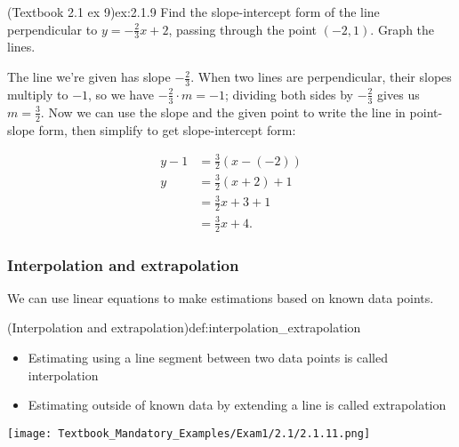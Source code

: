 \documentclass{article}
\begin{document}
\begin{example}{(Textbook 2.1 ex 9)}{ex:2.1.9}
    Find the slope-intercept form of the line perpendicular to $y=-\frac{2}{3}x+2$, passing through the point $(-2,1)$. Graph the lines.
\end{example}
\begin{solution}
    The line we're given has slope $-\frac{2}{3}$. When two lines are perpendicular, their slopes multiply to $-1$, so we have $-\frac{2}{3}\cdot m=-1$; dividing both sides by $-\frac{2}{3}$ gives us $m=\frac{3}{2}$. Now we can use the slope and the given point to write the line in point-slope form, then simplify to get slope-intercept form:
    \begin{minipage}{.49\textwidth}
        \begin{align*}
            y-1&=\frac{3}{2}(x-(-2))\\
            y&=\frac{3}{2}(x+2)+1\\
            &=\frac{3}{2}x+3+1\\
            &=\frac{3}{2}x+4.
        \end{align*}
    \end{minipage}
    \begin{minipage}{.49\textwidth}
        \begin{center}\end{center}
    \end{minipage}
\end{solution}

\subsubsection{Interpolation and extrapolation}

We can use linear equations to make estimations based on known data points.
\begin{definition}{(Interpolation and extrapolation)}{def:interpolation_extrapolation}
    \begin{itemize}
        \item Estimating using a line segment between two data points is called interpolation
        \item Estimating outside of known data by extending a line is called extrapolation
    \end{itemize}
\end{definition}

\texttt{[image: Textbook\_Mandatory\_Examples/Exam1/2.1/2.1.11.png]}


\end{document}
